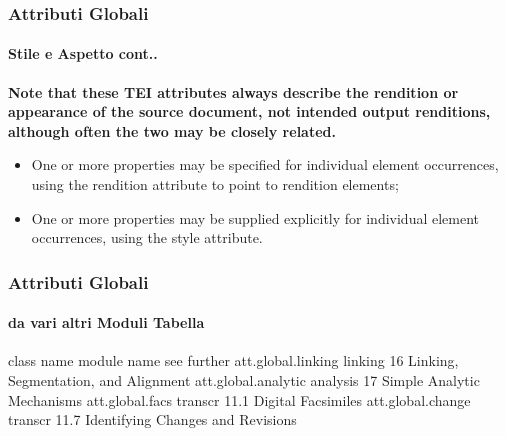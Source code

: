 \begin{frame}
    \frametitle{Attributi Globali}
    \framesubtitle{Stile e Aspetto cont..}
    \addtocounter{nframe}{1}
    
    \textbf{Note that these TEI attributes always describe the rendition or appearance of the source document, not intended output renditions, although often the two may be closely related.}

    \begin{itemize}
        \item One or more properties may be specified for individual element occurrences, using the rendition attribute to point to rendition elements;
        \item One or more properties may be supplied explicitly for individual element occurrences, using the style attribute.
    \end{itemize}

\end{frame}



\begin{frame}
    \frametitle{Attributi Globali}
    \framesubtitle{da vari altri Moduli Tabella}
    \addtocounter{nframe}{1}
class name	module name	see further
att.global.linking	linking	16 Linking, Segmentation, and Alignment
att.global.analytic	analysis	17 Simple Analytic Mechanisms
att.global.facs	transcr	11.1 Digital Facsimiles
att.global.change	transcr	11.7 Identifying Changes and Revisions

\end{frame}


% 
